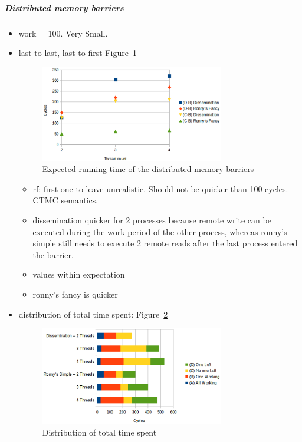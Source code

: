 \documentclass[a4paper, 10pt]{article}
\begin{document}
\subparagraph{Distributed memory barriers}
\label{sssssec:analysis-modelchecking-quantitative-properties-results-distributed}
\begin{itemize}
	\item work = 100. Very Small.
	\item last to last, last to first Figure~\ref{fig:df-work-100-B-C-D}
		\begin{figure}[htbp]
			\centering
			\includegraphics[width=8cm]{charts/df-work-100-B-C-D}
			\caption{Expected running time of the distributed memory barriers}
			\label{fig:df-work-100-B-C-D}
		\end{figure}
		\begin{itemize}
			\item rf: first one to leave unrealistic. Should not be quicker than 100 cycles. CTMC semantics.
			\item dissemination quicker for 2 processes because remote write can be executed during the work period of the other process, whereas ronny's simple still needs to execute 2 remote reads after the last process entered the barrier.
			\item values within expectation
			\item ronny's fancy is quicker
		\end{itemize}
	\item distribution of total time spent: Figure~\ref{fig:df-work-100-partition}
		\begin{figure}[htbp]
			\centering
			\includegraphics[width=8cm]{charts/df-work-100-partition}
			\caption{Distribution of total time spent}
			\label{fig:df-work-100-partition}
		\end{figure}

\end{itemize}
\end{document}
